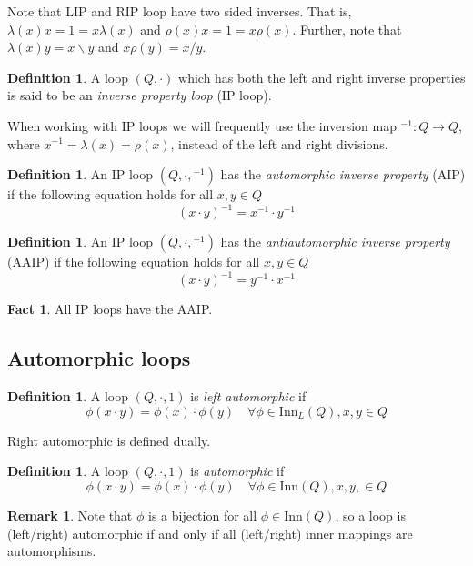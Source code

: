 \documentclass[12pt]{report}
\theoremstyle{definition}
\newtheorem{fct}[thm]{Fact}
\newtheorem{dfn}[thm]{Definition}
\newtheorem*{rmk}{Remark}
\newcommand{\ldv}{\backslash}       %
\newcommand{\rdv}{/}                %
\newcommand{\inn}{\text{Inn}}       %
\begin{document}
Note that LIP and RIP loop have two sided inverses. That is, $\lambda(x) x = 1 = x \lambda(x)$ and $\rho(x) x = 1 = x \rho(x)$.
  Further, note that $\lambda(x)y = x\ldv y$ and $x\rho(y) = x\rdv y$.

\begin{dfn}
  A loop $(Q, \cdot)$ which has both the left and right inverse properties is said to be an \emph{inverse property loop}
    (IP loop).
\end{dfn}

When working with IP loops we will frequently use the inversion map ${}^{-1}:Q\to Q$, where
  $x^{-1} = \lambda(x) = \rho(x)$, instead of the left and right divisions.

\begin{dfn}
  An IP loop $(Q, \cdot, {}^{-1})$ has the \emph{automorphic inverse property} (AIP) if the following equation holds
    for all $x, y\in Q$
  \[(x\cdot y)^{-1} = x^{-1}\cdot y^{-1}\]
\end{dfn}

\begin{dfn}
  An IP loop $(Q, \cdot, {}^{-1})$ has the \emph{antiautomorphic inverse property} (AAIP) if the following equation
    holds for all $x, y\in Q$
  \[(x\cdot y)^{-1} = y^{-1}\cdot x^{-1}\]
\end{dfn}

\begin{fct}
  All IP loops have the AAIP.
\end{fct}

\subsection{Automorphic loops}

\begin{dfn}
  A loop $(Q, \cdot, 1)$ is \emph{left automorphic} if
  \[\phi(x\cdot y) = \phi(x)\cdot \phi(y)\quad \forall \phi\in\inn_L(Q), x, y\in Q\]
\end{dfn}

Right automorphic is defined dually.

\begin{dfn}
  A loop $(Q, \cdot, 1)$ is \emph{automorphic} if
  \[\phi(x\cdot y) = \phi(x)\cdot \phi(y)\quad \forall \phi\in\inn(Q), x, y,\in Q\]
\end{dfn}

\begin{rmk}
  Note that $\phi$ is a bijection for all $\phi\in\inn(Q)$, so a loop is (left/right) automorphic if and only if
    all (left/right) inner mappings are automorphisms.
\end{rmk}
\end{document}
